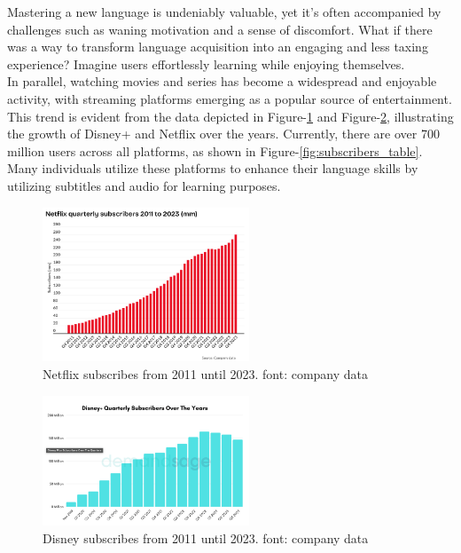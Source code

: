\documentclass[12pt]{article}
\begin{document}
Mastering a new language is undeniably valuable, yet it's often accompanied by challenges such as waning motivation and a sense of discomfort. What if there was a way to transform language acquisition into an engaging and less taxing experience? Imagine users effortlessly learning while enjoying themselves. \\
In parallel, watching movies and series has become a widespread and enjoyable activity, with streaming platforms emerging as a popular source of entertainment. This trend is evident from the data depicted in Figure-\ref{fig:netflix_quarter} and Figure-\ref{fig:disney_quarter}, illustrating the growth of Disney+ and Netflix over the years. Currently, there are over 700 million users across all platforms, as shown in Figure-\ref{fig:subscribers_table}. Many individuals utilize these platforms to enhance their language skills by utilizing subtitles and audio for learning purposes. \\ 
\begin{figure}[!h]
\centering
\caption{Netflix subscribes from 2011 until 2023. font: company data}
\label{fig:netflix_quarter}
\includegraphics[width=0.55\textwidth]{assets/27.png}
\end{figure} 

\begin{figure}[!h]
\centering
\caption{Disney subscribes from 2011 until 2023. font: company data}
\label{fig:disney_quarter}
\includegraphics[width=0.55\textwidth]{assets/28.png}
\end{figure} 
\end{document}
